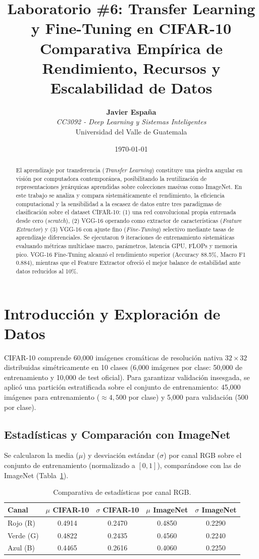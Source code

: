 \documentclass[10pt,twocolumn,a4paper]{article}
\title{\vspace{-0.8cm}\textbf{\Large Laboratorio \#6: Transfer Learning y Fine-Tuning en CIFAR-10}\\
\large Comparativa Empírica de Rendimiento, Recursos y Escalabilidad de Datos}
\author{\textbf{Javier España} \\
\textit{CC3092 - Deep Learning y Sistemas Inteligentes} \\
Universidad del Valle de Guatemala}
\date{\vspace{-0.4cm}\today}
\begin{document}
\maketitle

\begin{abstract}
\noindent El aprendizaje por transferencia (\textit{Transfer Learning}) constituye una piedra angular en visión por computadora contemporánea, posibilitando la reutilización de representaciones jerárquicas aprendidas sobre colecciones masivas como ImageNet. En este trabajo se analiza y compara sistemáticamente el rendimiento, la eficiencia computacional y la sensibilidad a la escasez de datos entre tres paradigmas de clasificación sobre el dataset CIFAR-10: (1) una red convolucional propia entrenada desde cero (\textit{scratch}), (2) VGG-16 operando como extractor de características (\textit{Feature Extractor}) y (3) VGG-16 con ajuste fino (\textit{Fine-Tuning}) selectivo mediante tasas de aprendizaje diferenciales. Se ejecutaron 9 iteraciones de entrenamiento sistemáticas evaluando métricas multiclase macro, parámetros, latencia GPU, FLOPs y memoria pico. VGG-16 Fine-Tuning alcanzó el rendimiento superior (Accuracy 88.5\%, Macro F1 0.884), mientras que el Feature Extractor ofreció el mejor balance de estabilidad ante datos reducidos al 10\%.
\end{abstract}

\section{Introducción y Exploración de Datos}
CIFAR-10 comprende 60,000 imágenes cromáticas de resolución nativa $32\times 32$ distribuidas simétricamente en 10 clases (6,000 imágenes por clase: 50,000 de entrenamiento y 10,000 de test oficial). Para garantizar validación insesgada, se aplicó una partición estratificada sobre el conjunto de entrenamiento: 45,000 imágenes para entrenamiento ($\approx 4,500$ por clase) y 5,000 para validación ($500$ por clase).

\subsection{Estadísticas y Comparación con ImageNet}
Se calcularon la media ($\mu$) y desviación estándar ($\sigma$) por canal RGB sobre el conjunto de entrenamiento (normalizado a $[0, 1]$), comparándose con las de ImageNet (Tabla~\ref{tab:stats}).

\begin{table}[h!]
\centering
\footnotesize
\caption{Comparativa de estadísticas por canal RGB.}
\label{tab:stats}
\begin{tabular}{lcccc}
\toprule
\textbf{Canal} & \textbf{$\mu$ CIFAR-10} & \textbf{$\sigma$ CIFAR-10} & \textbf{$\mu$ ImageNet} & \textbf{$\sigma$ ImageNet} \\
\midrule
Rojo (R)  & 0.4914 & 0.2470 & 0.4850 & 0.2290 \\
Verde (G) & 0.4822 & 0.2435 & 0.4560 & 0.2240 \\
Azul (B)  & 0.4465 & 0.2616 & 0.4060 & 0.2250 \\
\bottomrule
\end{tabular}
\end{table}
\end{document}

